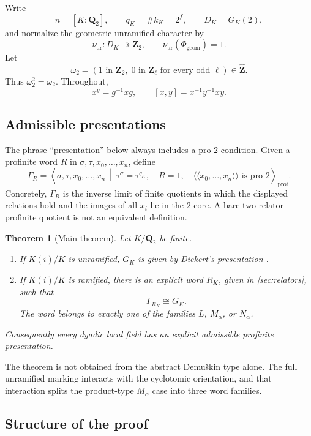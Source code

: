 \documentclass[11pt,reqno]{amsart}
\newtheorem{theorem}{Theorem}[section]
\theoremstyle{definition}
\theoremstyle{remark}
\numberwithin{equation}{section}
\newcommand{\Q}{\mathbf Q}
\newcommand{\Z}{\mathbf Z}
\newcommand{\ur}{\mathrm{ur}}
\newcommand{\prof}{\mathrm{prof}}
\newcommand{\whZ}{\widehat{\Z}}
\begin{document}
Write
\[
 n=[K:\Q_2],\qquad q_K=\#k_K=2^f,\qquad D_K=G_K(2),
\]
and normalize the geometric unramified character by
\[
 \nu_{\ur}:D_K\twoheadrightarrow\Z_2,\qquad
 \nu_{\ur}(\Phi_{\mathrm{geom}})=1.
\]
Let
\[
 \omega_2=(1\text{ in }\Z_2,\;0\text{ in }\Z_\ell
                    \text{ for every odd }\ell)\in\whZ.
\]
Thus \(\omega_2^2=\omega_2\).  Throughout,
\[
 x^g=g^{-1}xg,\qquad [x,y]=x^{-1}y^{-1}xy.
\]

\subsection{Admissible presentations}

The phrase ``presentation'' below always includes a pro-\(2\) condition.
Given a profinite word \(R\) in
\(\sigma,\tau,x_0,\ldots,x_n\), define
\begin{equation}\label{eq:candidate}
 \Gamma_R=
 \left\langle
 \sigma,\tau,x_0,\ldots,x_n
 \ \middle|\
 \tau^\sigma=\tau^{q_K},\quad R=1,\quad
 \overline{\langle\!\langle x_0,\ldots,x_n\rangle\!\rangle}
 \text{ is pro-}2
 \right\rangle_{\prof}.
\end{equation}
Concretely, \(\Gamma_R\) is the inverse limit of finite quotients in
which the displayed relations hold and the images of all \(x_i\) lie in
the \(2\)-core.  A bare two-relator profinite quotient is not an
equivalent definition.

\begin{theorem}[Main theorem]\label{thm:main}
Let \(K/\Q_2\) be finite.
\begin{enumerate}
\item If \(K(i)/K\) is unramified, \(G_K\) is given by Diekert's
presentation \cite{Diekert1984}.
\item If \(K(i)/K\) is ramified, there is an explicit word \(R_K\),
given in \cref{sec:relators}, such that
\[
 \Gamma_{R_K}\cong G_K.
\]
The word belongs to exactly one of the families \(L\), \(M_\alpha\), or
\(N_\alpha\).
\end{enumerate}
Consequently every dyadic local field has an explicit admissible
profinite presentation.
\end{theorem}

The theorem is not obtained from the abstract Demu\v{s}kin type alone.
The full unramified marking interacts with the cyclotomic orientation,
and that interaction splits the product-type \(M_\alpha\) case into
three word families.

\subsection{Structure of the proof}
\end{document}
